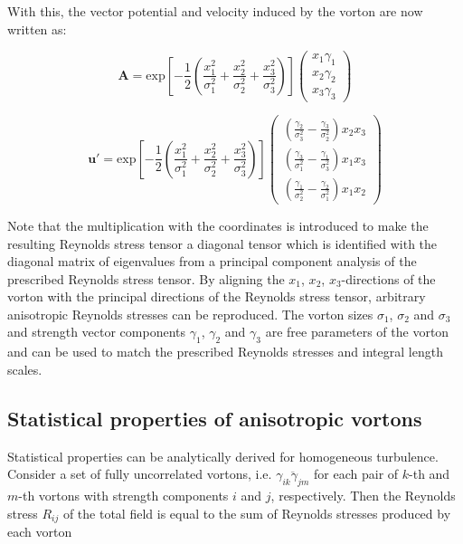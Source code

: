 \noindent With this, the vector potential and velocity induced by the vorton are now written as:

\begin{equation}
	\boldsymbol{A}=\mathrm{exp}\left[-\frac{1}{2}\left(\frac{x_1^2}{\sigma_1^2}+\frac{x_2^2}{\sigma_2^2}+\frac{x_3^2}{\sigma_3^2}\right)\right]\left(\begin{matrix}x_1\gamma_1 \\ x_2\gamma_2 \\ x_3\gamma_3\end{matrix}\right) 
\end{equation}

\begin{equation} \label{anisotropicU}
	\boldsymbol{u}'=\mathrm{exp}\left[-\frac{1}{2}\left(\frac{x_1^2}{\sigma_1^2}+\frac{x_2^2}{\sigma_2^2}+\frac{x_3^2}{\sigma_3^2}\right)\right]\left(\begin{matrix}\left(\frac{\gamma_2}{\sigma_3^2}-\frac{\gamma_3}{\sigma_2^2}\right)x_2x_3 \\ \left(\frac{\gamma_3}{\sigma_1^2}-\frac{\gamma_1}{\sigma_3^2}\right)x_1x_3 \\ \left(\frac{\gamma_1}{\sigma_2^2}-\frac{\gamma_2}{\sigma_1^2}\right)x_1x_2\end{matrix}\right) 
\end{equation}

\noindent Note that the multiplication with the coordinates is introduced to make the resulting Reynolds stress tensor a diagonal tensor which is identified with the diagonal matrix of eigenvalues from a principal component analysis of the prescribed Reynolds stress tensor. By aligning the $x_1$, $x_2$, $x_3$-directions of the vorton with the principal directions of the Reynolds stress tensor, arbitrary anisotropic Reynolds stresses can be reproduced. The vorton sizes $\sigma_1$, $\sigma_2$ and $\sigma_3$ and strength vector components $\gamma_1$, $\gamma_2$ and $\gamma_3$ are free parameters of the vorton and can be used to match the prescribed Reynolds stresses and integral length scales.

\subsection{Statistical properties of anisotropic vortons}


Statistical properties can be analytically derived for homogeneous turbulence. Consider a set of fully uncorrelated vortons, i.e. $\overline{\gamma_{ik}\gamma_{jm}}$ for each pair of $k$-th and  $m$-th vortons with strength components $i$ and $j$, respectively. Then the Reynolds stress $R_{ij}$ of the total field is equal to the sum of Reynolds stresses produced by each vorton

